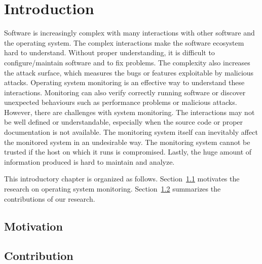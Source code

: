 \chapter{Introduction}

Software is increasingly complex with many interactions with other software
and the operating system.
The complex interactions make the software ecosystem hard to understand.
Without proper understanding,
it is difficult to configure/maintain software and to fix problems.
The complexity also increases the attack surface, which measures the
bugs or features exploitable by malicious attacks.
Operating system monitoring is an effective way to understand these
interactions.
Monitoring can also verify correctly running software or discover
unexpected behaviours such as performance problems or malicious attacks.
However, there are challenges with system monitoring.
The interactions may not be well defined or understandable,
especially when the source code or proper documentation is not available.
The monitoring system itself can inevitably affect the monitored system
in an undesirable way.
The monitoring system cannot be trusted if the host on which it
runs is compromised.
Lastly, the huge amount of information produced is hard to maintain and
analyze.

This introductory chapter is organized as follows.
Section~\ref{sec:motivation} motivates the research on operating system monitoring.
Section~\ref{sec:contribution} summarizes the contributions of our research.

\section{Motivation}
\label{sec:motivation}


\section{Contribution}
\label{sec:contribution}

